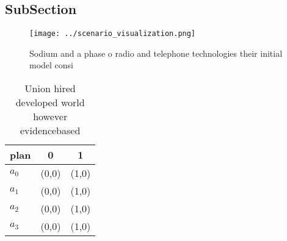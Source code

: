 \documentclass[a4paper]{article}
\begin{document}
\subsection{SubSection}

\begin{figure}
\centering
\texttt{[image: ../scenario\_visualization.png]}
\caption{Sodium and a phase o radio and telephone technologies their initial model consi
}
\end{figure}
 
\begin{table}
\begin{adjustbox}{width=0.8\columnwidth}
\begin{tabular}{|l|l|l|}
\hline
\textbf{plan} & \multicolumn{1}{c|}{\textbf{0}} & \multicolumn{1}{c|}{\textbf{1}} \\ \hline
\textbf{$a_0$}  & (0,0) & (1,0) \\ \hline
\textbf{$a_1$}  & (0,0) & (1,0) \\ \hline
\textbf{$a_2$}  & (0,0) & (1,0) \\ \hline
\textbf{$a_3$}  & (0,0) & (1,0) \\ \hline
\end{tabular}
\end{adjustbox}
\caption{Union hired developed world however evidencebased
}
\end{table}
\end{document}
